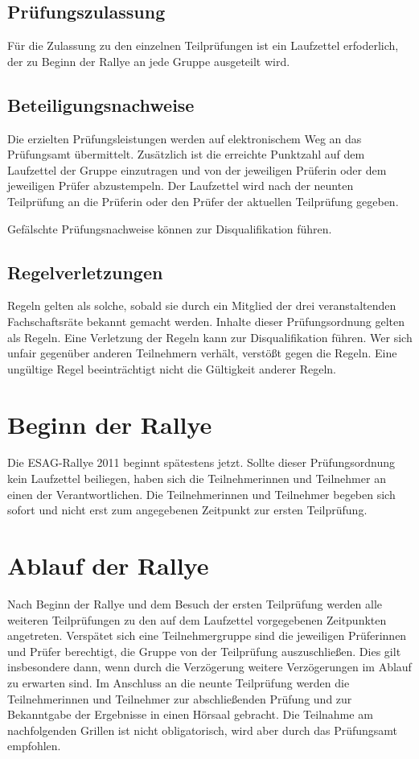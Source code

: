\documentclass[a4paper,10pt]{article}
\begin{document}
\subsection{Prüfungszulassung}

Für die Zulassung zu den einzelnen Teilprüfungen ist ein Laufzettel erfoderlich, 
der zu Beginn der Rallye an jede Gruppe ausgeteilt wird.

\subsection{Beteiligungsnachweise}


Die erzielten Prüfungsleistungen werden auf elektronischem Weg an das
Prüfungsamt übermittelt. Zusätzlich ist die erreichte Punktzahl auf dem 
Laufzettel der Gruppe einzutragen und von der jeweiligen Prüferin oder dem
jeweiligen Prüfer abzustempeln. 
Der Laufzettel wird nach der neunten Teilprüfung an die Prüferin oder den Prüfer 
der aktuellen Teilprüfung gegeben.

Gefälschte Prüfungsnachweise können zur Disqualifikation führen.

\subsection{Regelverletzungen}

Regeln gelten als solche, sobald sie durch ein Mitglied der drei 
veranstaltenden Fachschaftsräte bekannt gemacht werden. Inhalte dieser
Prüfungsordnung gelten als Regeln. Eine Verletzung der Regeln kann zur
Disqualifikation führen. Wer sich unfair gegenüber anderen Teilnehmern
verhält, verstößt gegen die Regeln. Eine ungültige Regel beeinträchtigt
nicht die Gültigkeit anderer Regeln.



\section{Beginn der Rallye}

Die ESAG-Rallye 2011 beginnt spätestens jetzt. Sollte dieser Prüfungsordnung
kein Laufzettel beiliegen, haben sich die Teilnehmerinnen und Teilnehmer an 
einen der Verantwortlichen. Die Teilnehmerinnen und Teilnehmer begeben sich 
sofort und nicht erst zum angegebenen Zeitpunkt zur ersten Teilprüfung.

\section{Ablauf der Rallye}
Nach Beginn der Rallye und dem Besuch der ersten Teilprüfung werden alle 
weiteren Teilprüfungen zu den auf dem Laufzettel vorgegebenen Zeitpunkten 
angetreten. Verspätet sich eine Teilnehmergruppe sind die jeweiligen Prüferinnen
und Prüfer berechtigt, die Gruppe von der Teilprüfung auszuschließen. Dies 
gilt insbesondere dann, wenn durch die Verzögerung weitere Verzögerungen im 
Ablauf zu erwarten sind. Im Anschluss an die neunte Teilprüfung werden die 
Teilnehmerinnen und Teilnehmer zur abschließenden Prüfung und zur Bekanntgabe 
der Ergebnisse in einen Hörsaal gebracht. Die Teilnahme am nachfolgenden 
Grillen ist nicht obligatorisch, wird aber durch das Prüfungsamt empfohlen.
\end{document}
